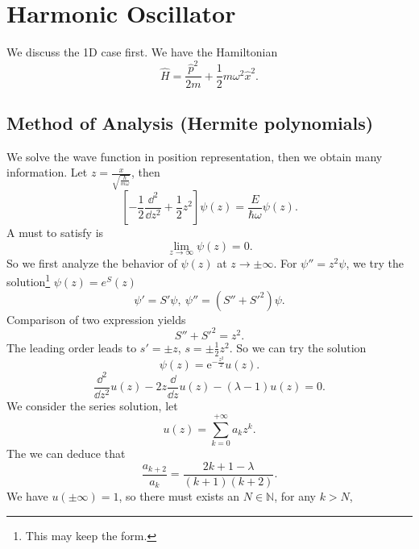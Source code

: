 \documentclass{article}
\theoremstyle{1}
\newcommand{\ee}{\mathrm{e}}
\begin{document}
\section{Harmonic Oscillator}

We discuss the 1D case first. We have the Hamiltonian
\begin{equation}
    \hat{H}=\frac{\hat{p}^2}{2m}+\frac{1}{2}m\omega^2\hat{x}^2.
\end{equation}
\subsection{Method of Analysis (Hermite polynomials)}
We solve the wave function in position representation, then we obtain many information. Let $z=\frac{x}{\sqrt{\frac{\hbar}{m\omega}}}$, then 
\begin{equation}
    \left[-\frac{1}{2}\frac{\dd^2}{\dd{z}^2}+\frac{1}{2}z^2\right]\psi(z)=\frac{E}{\hbar \omega}\psi(z).
\end{equation}
A must to satisfy is 
\begin{equation}
    \lim_{z\rightarrow \infty}\psi(z)=0.   
\end{equation}
So we first analyze the behavior of $\psi(z)$ at $z\rightarrow \pm\infty$. For $\psi''=z^2\psi$, we try the solution\footnote{This may keep the form.} $\psi(z)=e^S(z)$
\begin{equation}
    \psi'=S'\psi,\ \psi''=\left(S''+S'^2\right)\psi.
\end{equation}
Comparison of two expression yields
\begin{equation}
    S''+S'^2=z^2.
\end{equation}
The leading order leads to $s'=\pm z$, $s=\pm\frac{1}{2}z^2$. So we can try the solution 
\begin{equation}
    \psi(z)=\ee^{-\frac{z^2}{2}} u(z).
\end{equation}
\begin{equation}\label{9.6}
    \frac{\dd^2}{\dd{z}^2}u(z)-2z\frac{\dd}{\dd{z}}u(z)-\left(\lambda-1\right)u(z)=0.
\end{equation}
We consider the series solution, let
\begin{equation}
    u(z)=\sum_{k=0}^{+\infty}a_kz^k.
\end{equation}
The we can deduce that 
\begin{equation}
    \frac{a_{k+2}}{a_k}=\frac{2k+1-\lambda}{(k+1)(k+2)}.
\end{equation}
We have $u(\pm\infty)=1$, so there must exists an $N\in \mathbb{N}$, for any $k>N$, 
\end{document}
